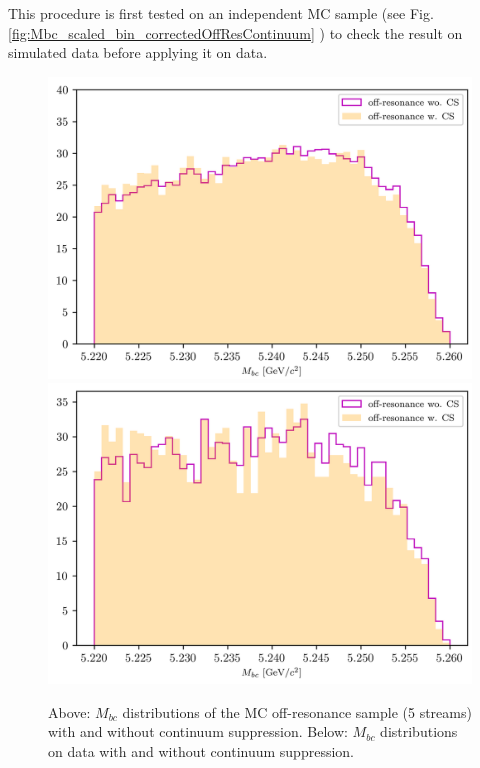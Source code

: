 \noindent This procedure is first tested on an independent MC sample (see Fig. \ref{fig:Mbc_scaled_bin_correctedOffResContinuum} ) to check the result on simulated data before applying it on data.



\begin{figure}[H]
\centering
\subcaptionbox{\label{fig:corrLambdaC_OffResonance_w_wo_CS_comparison_5streams}}
{\includegraphics[width=.65\textwidth]{04-SimultaneousFit/figs/corrLambdaC_OffResonance_w_wo_CS_comparison_5streams.png}} 
\subcaptionbox{\label{fig:corrLambdaC_OffResonance_w_wo_CS_comparison_Data}}
{\includegraphics[width=.65\textwidth]{04-SimultaneousFit/figs/corrLambdaC_OffResonance_w_wo_CS_comparison_Data.png}} 
\caption{Above: $M_{bc}$ distributions of the MC off-resonance sample (5 streams) with and without continuum suppression. Below: $M_{bc}$ distributions on data with and without continuum suppression.}
\end{figure}




